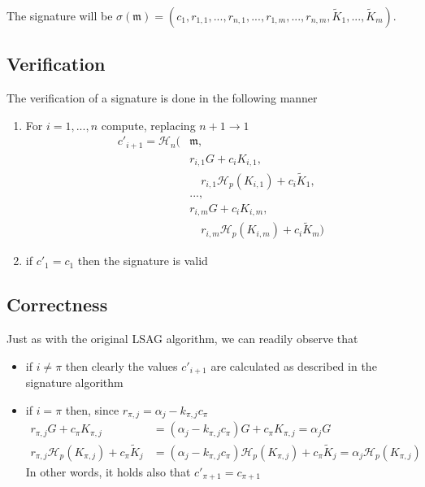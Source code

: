The signature will be \(\sigma(\mathfrak{m}) = (c_1, r_{1, 1}, ..., r_{n, 1}, ..., r_{1, m}, ..., r_{n, m}, \tilde{K}_1, ...,  \tilde{K}_m) \).

\subsection*{Verification}

The verification of a signature is done in the following manner

\begin{enumerate}
	\item  For \(i = 1, ..., n\) compute, replacing \(n + 1 \rightarrow 1\)
	\begin{align*}
	c'_{i+1} = \mathcal{H}_n(&\mathfrak{m}, \\
	                         & r_{i, 1} G + c_i K_{i, 1}, \\
	                         & \quad r_{i, 1} \mathcal{H}_p(K_{i, 1}) + c_i \tilde{K}_1,\\ 
	                         & ..., \\
	                         & r_{i, m} G + c_i K_{i, m}, \\
	                         & \quad r_{i, m} \mathcal{H}_p(K_{i, m}) + c_i \tilde{K}_m) 
	\end{align*}
	
	\item if \(c'_1 = c_1\) then the signature is valid
\end{enumerate}


\subsection*{Correctness}

Just as with the original LSAG algorithm, we can readily observe that

\begin{itemize}

\item[] if \(i \ne \pi \) then clearly the values \(c'_{i + 1}\) are calculated as described in the signature algorithm

\item[] if \(i = \pi\) then, since \(r_{\pi, j} = \alpha_j -k_{\pi, j} c_\pi \)
\begin{align*}  
  r_{\pi, j} G + c_\pi K_{\pi,j}                              
                   &= (\alpha_j - k_{\pi, j} c_\pi) G + c_\pi K_{\pi, j}     
                   = \alpha_j G \\  
  r_{\pi, j} \mathcal{H}_p(K_{\pi, j}) + c_\pi \tilde{K}_j  
                   &= (\alpha_j - k_{\pi, j} c_\pi) \mathcal{H}_p(K_{\pi, j}) + c_\pi \tilde{K}_j 
                   = \alpha_j \mathcal{H}_p(K_{\pi, j}) 
\end{align*}
   In other words, it holds also that \(c'_{\pi + 1} = c_{\pi+1}\) 

\end{itemize}



